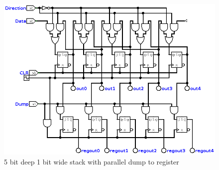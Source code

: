 \documentclass[11pt]{scrartcl}
\begin{document}
\pagebreak

\begin{figure}[h]
    \includegraphics[scale=0.5]{images/stackdump.png}
    \caption{5 bit deep 1 bit wide stack with parallel dump to register}
\end{figure}
\end{document}
